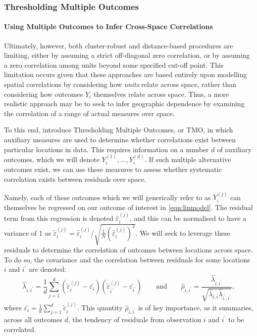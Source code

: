 \documentclass[varwidth,bib]{statapress}
\begin{document}
\subsubsection{Thresholding Multiple Outcomes}
\paragraph{Using Multiple Outcomes to Infer Cross-Space Correlations} 
Ultimately, however, both cluster-robust and distance-based procedures are limiting, either by assuming a strict off-diagonal zero correlation, or by assuming a zero correlation among units beyond some specified cut-off point.  This limitation occurs given that these approaches are based entirely upon modelling spatial correlations by considering how \textit{units} relate across space, rather than considering how outcomes $Y_i$ themselves relate across space.  Thus, a more realistic approach may be to seek to infer geographic dependence by examining the correlation of a range of actual measures over space.  

To this end, \citet{Dellavignaetal2025} introduce Thresholding Multiple Outcomes, or TMO, in which auxiliary measures are used to determine whether correlations exist between particular locations in data.  This requires information on a number $d$ of auxiliary outcomes, which we will denote $Y_i^{(1)}, \ldots, Y_i^{(d)}$.  If such multiple alternative outcomes exist, we can use these measures to assess whether systematic correlation exists between residuals over space.

Namely, each of these outcomes which we will generically refer to as $Y_i^{(j)}$ can themselves be regressed on our outcome of interest in \eqref{eqn:linmodel}.  The residual term from this regression is denoted $\widehat\varepsilon_i^{(j)}$, and this can be normalised to have a variance of 1 as $\tilde\varepsilon_i^{(j)}=\widehat\varepsilon_i^{(j)}/\sqrt{\frac{1}{N}(\widehat\varepsilon_i^{(j)})^2}$.  We will seek to leverage these residuals to determine the correlation of outcomes between locations across space.  To do so, the covariance and the correlation between residuals for some locations $i$ and $i^\prime$ are denoted:
\begin{equation}
\widehat\lambda_{i,i^\prime}=\frac{1}{d}\sum_{j=1}^d(\tilde\varepsilon_i^{(j)}-\bar{\varepsilon_i})(\tilde\varepsilon_{i^\prime}^{(j)}-\bar{\varepsilon_{i^\prime}}) \qquad \text{and} \qquad \widehat\rho_{i,i^\prime}=\frac{\widehat\lambda_{i,i^\prime}}{\sqrt{\widehat\lambda_{i,i}\widehat\lambda_{i^\prime,i^\prime}}},
\end{equation}
where $\bar{\varepsilon_i}=\frac{1}{d}\sum_{j=1}^d\tilde\varepsilon_i^{(j)}$. This quantity $\widehat\rho_{i,i^\prime}$ is of key importance, as it summaries, across all outcomes $d$, the tendency of residuals from observation $i$ and $i^\prime$ to be correlated.
\end{document}
